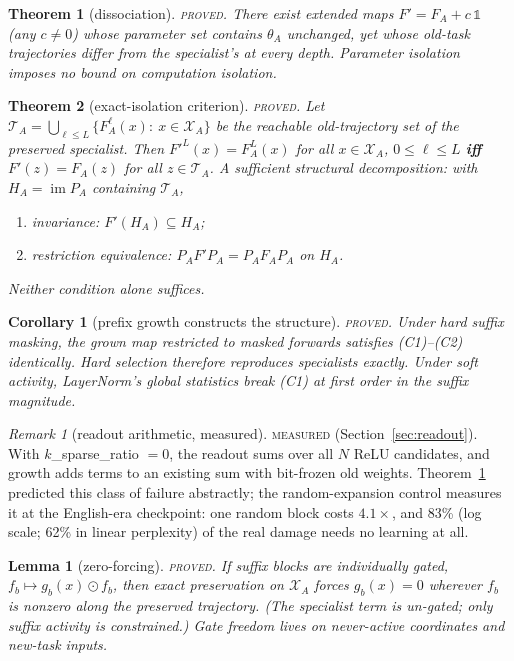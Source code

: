 \documentclass[11pt]{article}
\newtheorem{theorem}{Theorem}
\newtheorem{lemma}{Lemma}
\newtheorem{corollary}{Corollary}
\theoremstyle{definition}\newtheorem{definition}{Definition}
\theoremstyle{remark}\newtheorem{remark}{Remark}
\newcommand{\Xa}{\mathcal{X}_A}
\newcommand{\TA}{\mathcal{T}_A}
\begin{document}
\begin{theorem}[dissociation]\label{thm:dissoc}
\textsc{proved.} There exist extended maps $F'=F_A+c\,\mathbb{1}$ (any $c\neq0$) whose
parameter set contains $\theta_A$ unchanged, yet whose old-task trajectories differ from the
specialist's at every depth. Parameter isolation imposes no bound on computation isolation.
\end{theorem}

\begin{theorem}[exact-isolation criterion]\label{thm:criterion}
\textsc{proved.} Let $\TA=\bigcup_{\ell\le L}\{F_A^\ell(x):\ x\in\Xa\}$ be the reachable
old-trajectory set of the preserved specialist. Then
$F'^L(x)=F_A^L(x)$ for all $x\in\Xa$, $0\le\ell\le L$
\;\textbf{iff}\;
$F'(z)=F_A(z)$ for all $z\in\TA$.
A sufficient structural decomposition: with $H_A=\operatorname{im}P_A$ containing $\TA$,
\begin{enumerate}
\item[(C1)] \emph{invariance}: $F'(H_A)\subseteq H_A$;
\item[(C2)] \emph{restriction equivalence}: $P_AF'P_A = P_AF_AP_A$ on $H_A$.
\end{enumerate}
Neither condition alone suffices.
\end{theorem}

\begin{corollary}[prefix growth constructs the structure]\label{cor:prefix}
\textsc{proved.} Under hard suffix masking, the grown map restricted to masked forwards
satisfies (C1)--(C2) identically. Hard selection therefore reproduces specialists exactly.
Under \emph{soft} activity, LayerNorm's global statistics break (C1) at first order in the
suffix magnitude.
\end{corollary}

\begin{remark}[readout arithmetic, measured]\label{rem:readout}
\textsc{measured} (Section~\ref{sec:readout}). With $k$\_sparse\_ratio $=0$, the readout
sums over all $N$ ReLU candidates, and growth adds terms to an existing sum with bit-frozen
old weights. Theorem~\ref{thm:dissoc} predicted this class of failure abstractly; the
random-expansion control measures it at the English-era checkpoint: one random block costs $4.1\times$, and 83\% (log scale; 62\% in linear perplexity) of the
real damage needs no learning at all.
\end{remark}

\begin{lemma}[zero-forcing]\label{lem:zf}
\textsc{proved.} If suffix blocks are individually gated, $f_b\mapsto g_b(x)\odot f_b$, then
exact preservation on $\mathcal{X}_A$ forces $g_b(x)=0$ wherever $f_b$ is nonzero along the
preserved trajectory. (The specialist term is un-gated; only suffix activity is constrained.)
Gate freedom lives on never-active coordinates and new-task inputs.
\end{lemma}
\end{document}
